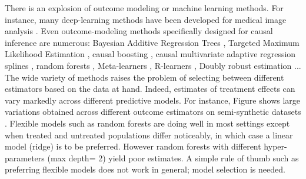 \documentclass[10pt]{article}
\begin{document}
\begin{multicols}{2}
    There is an explosion of outcome modeling or machine learning methods.
    For instance, many deep-learning methods have been developed for medical
    image analysis \cite{shen2017deep,monshi2020deep}.
    Even outcome-modeling methods specifically designed for causal
    inference are numerous: Bayesian Additive Regression Trees
    \cite{hill_bayesian_2011}, Targeted Maximum Likelihood Estimation
    \cite{laan_targeted_2011,schuler_targeted_2017}, causal boosting
    \cite{powers_methods_2018}, causal multivariate adaptive regression
    splines \cite{powers_methods_2018}, random forests
    \cite{wager_estimation_2018, athey_generalized_2019},
    Meta-learners \cite{kunzel_metalearners_2019}, R-learners
    \cite{nie_quasioracle_2017}, Doubly robust estimation
    \cite{chernozhukov_double_2018}...
    The wide variety of methods raises the problem
    of selecting between different estimators based on the data at hand.
    Indeed, estimates of treatment effects can vary markedly across different
    predictive models. For instance, Figure shows
    large variations obtained across different outcome estimators on
    semi-synthetic datasets \cite{dorie_automated_2019}. Flexible models
    such as random forests are doing well in most settings except
    when treated and untreated populations differ noticeably, in
    which case a linear model (ridge) is to be preferred.
    However random forests with different hyper-parameters
    (max depth= 2) yield poor estimates.
    A simple rule of thumb such as preferring flexible models does not work in
    general; model selection is needed.



\end{multicols}
\end{document}
